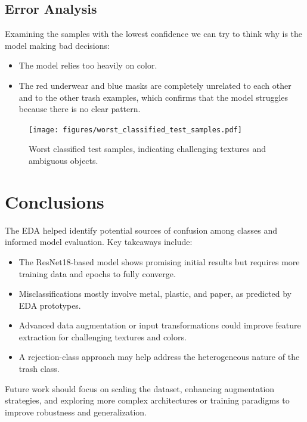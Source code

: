 \documentclass[12pt]{article}
\begin{document}
\subsection{Error Analysis}
Examining the samples with the lowest confidence we can try to think why is the model making bad decisions:
\begin{itemize}
    \item The model relies too heavily on color.
    \item The red underwear and blue masks are completely unrelated to each other and to the other trash examples, which confirms that the model struggles because there is no clear pattern.
\end{itemize}

\begin{figure}[h!]
    \centering
    \texttt{[image: figures/worst\_classified\_test\_samples.pdf]}
    \caption{Worst classified test samples, indicating challenging textures and ambiguous objects.}
    \label{fig:worst_samples}
\end{figure}

\newpage
\section{Conclusions}
The EDA helped identify potential sources of confusion among classes and informed model evaluation. Key takeaways include:

\begin{itemize}
    \item The ResNet18-based model shows promising initial results but requires more training data and epochs to fully converge.
    \item Misclassifications mostly involve metal, plastic, and paper, as predicted by EDA prototypes.
    \item Advanced data augmentation or input transformations could improve feature extraction for challenging textures and colors.
    \item A rejection-class approach may help address the heterogeneous nature of the trash class.
\end{itemize}

Future work should focus on scaling the dataset, enhancing augmentation strategies, and exploring more complex architectures or training paradigms to improve robustness and generalization.
\end{document}
